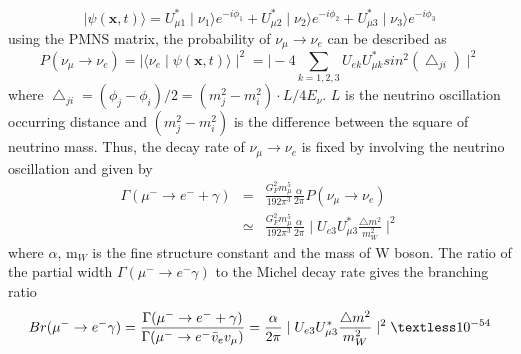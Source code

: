 \begin{equation}
 \mid\psi(\mathbf{x}, t)\rangle = U_{\mu1}^* \mid\nu_1\rangle e^{-i\phi_1} + U_{\mu2}^* \mid\nu_2\rangle e^{-i\phi_2} + U_{\mu3}^* \mid\nu_3\rangle e^{-i\phi_3}
\end{equation}
using the PMNS matrix, the probability of $\nu_\mu \rightarrow \nu_e$ can be described as
\begin{equation}
 P(\nu_\mu \rightarrow \nu_e) = \mid\langle\nu_e\mid\psi(\mathbf{x},t)\rangle\mid^2 = \mid-4\sum_{k=1,2,3}U_{ek}U^*_{\mu k}sin^2(\bigtriangleup_{ji})\mid^2
\end{equation}
where $\bigtriangleup_{ji} = (\phi_j-\phi_i)/2 = (m_j^2-m_i^2)\cdot L/4E_\nu$.
$L$ is the neutrino oscillation occurring distance and $(m_j^2-m_i^2)$ is the difference between the square of neutrino mass.
Thus, the decay rate of $\nu_\mu \rightarrow \nu_e$ is fixed by involving the neutrino oscillation and given by
\begin{eqnarray}
 \Gamma(\mu^- \rightarrow e^- + \gamma) &=& \frac{G_F^2 m_\mu^5}{192\pi^3}\frac{\alpha}{2\pi} P(\nu_\mu \rightarrow \nu_e) \nonumber \\
 &\simeq& \frac{G_F^2 m_\mu^5}{192\pi^3}\frac{\alpha}{2\pi}\mid U_{e3}U_{\mu3}^*\frac{\bigtriangleup m^2}{m_W^2}\mid^2
\end{eqnarray}
where $\alpha$, m$_W$ is the fine structure constant and the mass of W boson.
The ratio of the partial width $\Gamma(\mu^- \rightarrow e^-\gamma)$ to the Michel decay rate gives the branching ratio
\begin{equation}
 Br(\mu^- \rightarrow e^- \gamma) = \frac{\Gamma(\mu^- \rightarrow e^- + \gamma)}{\Gamma (\mu^- \rightarrow e^- \bar v_e v_\mu)} = \frac{\alpha}{2\pi}\mid U_{e3}U^*_{\mu3}\frac{\bigtriangleup m^2}{m_W^2}\mid^2 \textless 10^{-54}
\end{equation}

